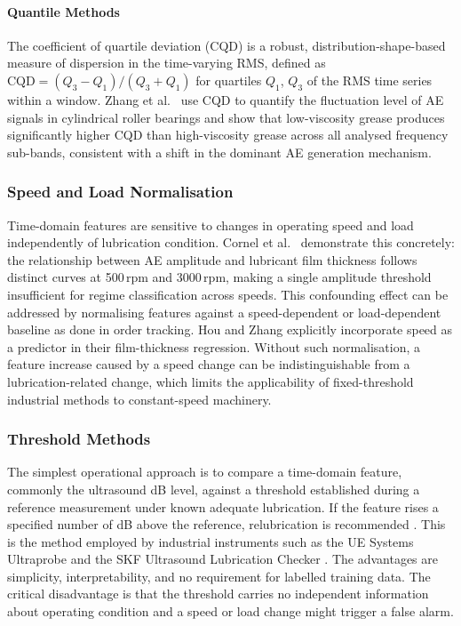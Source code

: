 \paragraph{Quantile Methods}
The coefficient of quartile deviation (CQD) is a robust, distribution-shape-based measure of dispersion in the time-varying RMS, defined as $\mathrm{CQD} = (Q_3 - Q_1)/(Q_3 + Q_1)$ for quartiles $Q_1$, $Q_3$ of the RMS time series within a window. Zhang et al.\ \cite{zhang_coupled_2026} use CQD to quantify the fluctuation level of AE signals in cylindrical roller bearings and show that low-viscosity grease produces significantly higher CQD than high-viscosity grease across all analysed frequency sub-bands, consistent with a shift in the dominant AE generation mechanism.

\subsubsection{Speed and Load Normalisation} Time-domain features are sensitive to changes in operating speed and load independently of lubrication condition. Cornel et al.\ \cite{cornel_condition_2021} demonstrate this concretely: the relationship between AE amplitude and lubricant film thickness follows distinct curves at 500\,rpm and 3000\,rpm, making a single amplitude threshold insufficient for regime classification across speeds. This confounding effect can be addressed by normalising features against a speed-dependent or load-dependent baseline as done in order tracking. Hou and Zhang \cite{hou_-situ_2025} explicitly incorporate speed as a predictor in their film-thickness regression. Without such normalisation, a feature increase caused by a speed change can be indistinguishable from a lubrication-related change, which limits the applicability of fixed-threshold industrial methods to constant-speed machinery.

\subsubsection{Threshold Methods}
\label{subsubsec:threshold}
The simplest operational approach is to compare a time-domain feature, commonly the ultrasound dB level, against a threshold established during a reference measurement under known adequate lubrication. If the feature rises a specified number of dB above the reference, relubrication is recommended \cite{lineham_ultrasonic_2008}. This is the method employed by industrial instruments such as the UE Systems Ultraprobe and the SKF Ultrasound Lubrication Checker \cite{ue_systems_ultraprobe_2026,skf_ultrasound_2026}. The advantages are simplicity, interpretability, and no requirement for labelled training data. The critical disadvantage is that the threshold carries no independent information about operating condition and a speed or load change might trigger a false alarm.


